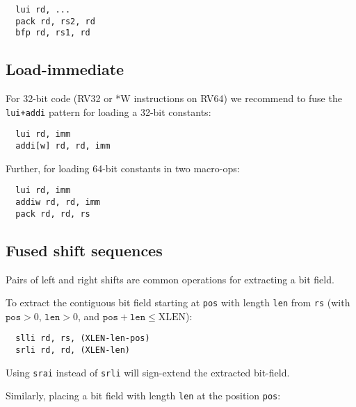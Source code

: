 \begin{minipage}{\linewidth}
\begin{verbatim}
  lui rd, ...
  pack rd, rs2, rd
  bfp rd, rs1, rd
\end{verbatim}
\end{minipage}

\subsection{Load-immediate}

For 32-bit code (RV32 or *W instructions on RV64) we recommend to fuse the {\tt
lui+addi} pattern for loading a 32-bit constants:

\begin{minipage}{\linewidth}
\begin{verbatim}
  lui rd, imm
  addi[w] rd, rd, imm
\end{verbatim}
\end{minipage}

Further, for loading 64-bit constants in two macro-ops:

\begin{minipage}{\linewidth}
\begin{verbatim}
  lui rd, imm
  addiw rd, rd, imm
  pack rd, rd, rs
\end{verbatim}
\end{minipage}

\subsection{Fused shift sequences}
\label{postfix-shift-fusion}

Pairs of left and right shifts are common operations for extracting a bit field.

To extract the contiguous bit field starting at {\tt pos} with length {\tt len}
from {\tt rs} (with $\texttt{pos}>0$, $\texttt{len}>0$, and
$\texttt{pos}+\texttt{len}\le\textrm{XLEN}$):

\begin{minipage}{\linewidth}
\begin{verbatim}
  slli rd, rs, (XLEN-len-pos)
  srli rd, rd, (XLEN-len)
\end{verbatim}
\end{minipage}

Using \texttt{srai} instead of \texttt{srli} will sign-extend the extracted bit-field.

Similarly, placing a bit field with length {\tt len} at the position {\tt pos}:

